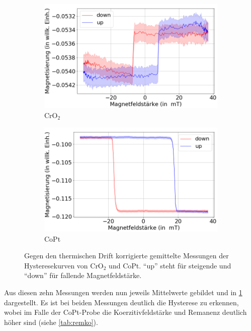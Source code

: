 \begin{figure}[H]
    \centering
    \begin{subfigure}{0.495\textwidth}
        \centering
        \includegraphics[width=1.1\textwidth]{plots/swp_avg_magn_man_cro}
    \caption{CrO$_2$}
    \end{subfigure}
    \begin{subfigure}{0.495\textwidth}
        \centering
        \includegraphics[width=1.1\textwidth]{plots/swp_avg_magn_man_copt}
        \caption{CoPt}
    \end{subfigure}
    \caption{Gegen den thermischen Drift korrigierte gemittelte Messungen der Hysteresekurven von CrO$_2$ und CoPt. \enquote{up} steht für steigende und \enquote{down} für fallende Magnetfeldstärke.}
    \label{fig_moke_averages}
\end{figure}

Aus diesen zehn Messungen werden nun jeweils Mittelwerte gebildet und in \cref{fig_moke_averages} dargestellt.
Es ist bei beiden Messungen deutlich die Hysterese zu erkennen, wobei im Falle der CoPt-Probe die Koerzitivfeldstärke und Remanenz deutlich höher sind (siehe \cref{tab:remko}).

